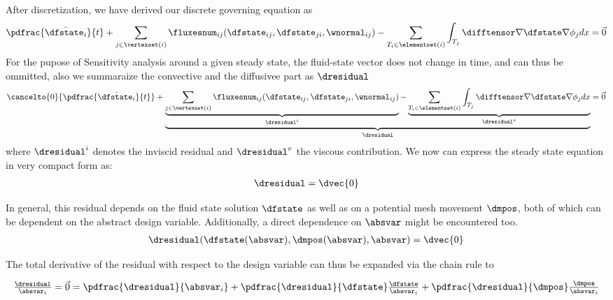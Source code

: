 \documentclass[../main.tex]{subfiles}
\begin{document}
After discretization, we have derived our discrete governing equation as 
\begin{align}\label{eq:nse_final_discretized_2}
\pdfrac{\bar{\dfstate_i}}{t} +
\sum_{j \in \vertexset(i)} \fluxesnum_{ij}(\dfstate_{ij},\dfstate_{ji},\wnormal_{ij}) -
\sum_{T_i \in \elementset(i)} \int_{T_j} \difftensor \nabla \dfstate \nabla \phi_j dx =
\vec{0}
\end{align}
For the pupose of Sensitivity analysis around a given steady state, the fluid-state vector does not change in time, and can thus be ommitted, also we summaraize the convective and the diffusivee part as $\dresidual$ 
\begin{align}\label{eq:nse_final_discretized_notationchange}
\cancelto{0}{\pdfrac{\bar{\dfstate_i}}{t}} +
\underbrace{
  \underbrace{\sum_{j \in \vertexset(i)} \fluxesnum_{ij}(\dfstate_{ij},\dfstate_{ji},\wnormal_{ij})}_{\dresidual^i} -
  \underbrace{\sum_{T_i \in \elementset(i)} \int_{T_j} \difftensor \nabla \dfstate \nabla \phi_j dx}_{\dresidual^v}      }_{\dresidual} =
\vec{0}
\end{align}
where $\dresidual^i$ denotes the inviscid residual and $\dresidual^v$ the viscous contribution.
We now can express the steady state equation in very compact form as:
\begin{align}\label{eq:discrete_steady_state}
\dresidual=\dvec{0}
\end{align}


In general, this residual depends on the fluid state solution $\dfstate$ as well as on a potential mesh movement $\dmpos$, both of which can be dependent on the abstract design variable. Additionally, a direct dependence on $\absvar$ might be encountered too.
\begin{align}
\dresidual(\dfstate(\absvar),\dmpos(\absvar),\absvar)=\dvec{0}
\end{align}

The total derivative of the residual with respect to the design variable can thus be expanded via the chain rule to

\def\DdresidualBYabsvarI{ \tfrac{\dresidual}{\absvar_i} }
\def\PdresidualBYabsvarI{ \pdfrac{\dresidual}{\absvar_i} }
\def\PdresidualBYdfstate{ \pdfrac{\dresidual}{\dfstate}  }
\def\DdfstateBYabsvarI  { \tfrac{\dfstate}{\absvar_i}   }
\def\PdresidualBYdmms   { \pdfrac{\dresidual}{\dmpos}     }
\def\DdmmsBYabsvarI     { \tfrac{\dmpos}{\absvar_i}      }
\begin{align}
\DdresidualBYabsvarI=\vec{0}=
\PdresidualBYabsvarI                      +
\PdresidualBYdfstate    \DdfstateBYabsvarI +
\PdresidualBYdmms       \DdmmsBYabsvarI
\end{align}
\end{document}
